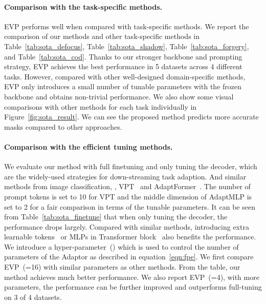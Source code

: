 \paragraph{Comparison with the task-specific methods.}
EVP performs well when compared with task-specific methods. We report the comparison of our methods and other task-specific methods in Table~\ref{tab:sota_defocus}, Table~\ref{tab:sota_shadow}, Table~\ref{tab:sota_forgery}, and Table~\ref{tab:sota_cod}. Thanks to our stronger backbone and prompting strategy, EVP achieves the best performance in 5 datasets across 4 different tasks. However, compared with other well-designed domain-specific methods, EVP only introduces a small number of tunable parameters with the frozen backbone and obtains non-trivial performance. We also show some visual comparisons with other methods for each task individually in Figure~\ref{fig:sota_result}. We can see the proposed method predicts more accurate masks compared to other approaches.



\paragraph{Comparison with the efficient tuning methods.}
We evaluate our method with full finetuning and only tuning the decoder, which are the widely-used strategies for down-streaming task adaption. And similar methods from image classification, \ie, VPT~\cite{vpt} and AdaptFormer~\cite{chen2022adaptformer}. 
The number of prompt tokens is set to 10 for VPT and the middle dimension of AdaptMLP is set to 2 for a fair comparison in terms of the tunable parameters.
It can be seen from Table~\ref{tab:sota_finetune} that when only tuning the decoder, the performance drops largely. Compared with similar methods, introducing extra learnable tokens~\cite{vpt} or MLPs in Transformer block~\cite{chen2022adaptformer} also benefits the performance. We introduce a hyper-parameter~() which is used to control the number of parameters of the Adaptor as described in equation~\ref{eqn:fpe}. We first compare EVP~(=16) with similar parameters as other methods. From the table, our method achieves much better performance. We also report EVP~(=4), with more parameters, the performance can be further improved and outperforms full-tuning on 3 of 4 datasets. 


